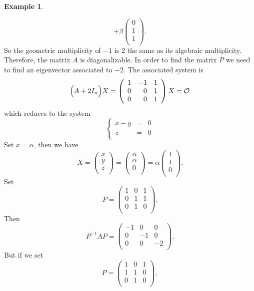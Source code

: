 \documentclass[11pt]{article}
\theoremstyle{definition}
\newtheorem{exmp}[thm]{Example}
\theoremstyle{plain}
\begin{document}
\begin{exmp}
\begin{enumerate}
\[+\beta \left(\begin{array}{r} 0\\ 1\\ 1\\ \end{array}\right).
\]
So the geometric multiplicity of $-1$ is $2$ the same as its algebraic multiplicity. Therefore, the matrix $A$ is diagonalizable. In order to find the matrix $P$ we need to find an eigenvector associated to $-2$. The associated system is
\[
\Big(A + 2 I_n \Big) X = \left(\begin{array}{rrr} 1&-1&1\\ 0&0&1\\ 0&0&1\\ \end{array}\right) X= {\cal O}
\]
which reduces to the system
\[
\left\{\begin{array}{rrr} x-y&=& 0\\ z&=&0\\ \end{array}\right.
\]
Set $x = \alpha$, then we have
\[
X = \left(\begin{array}{r} x\\ y\\ z\\ \end{array}\right)
=\left(\begin{array}{r} \alpha\\ \alpha\\ 0\\ \end{array}\right)
=\alpha \left(\begin{array}{r} 1\\ 1\\ 0\\ \end{array}\right).
\]
Set
\[
P = \left(\begin{array}{rrr} 1&0&1\\ 0&1&1\\ 0&1&0\\ \end{array}\right).
\]
Then
\[
P^{-1}AP = \left(\begin{array}{rrr} -1&0&0\\ 0&-1&0\\ 0&0&-2\\ \end{array}\right).
\]
But if we set
\[
P = \left(\begin{array}{rrr} 1&0&1\\ 1&1&0\\ 0&1&0\\ \end{array}\right),
\]
\end{enumerate}
\end{exmp}
\end{document}
